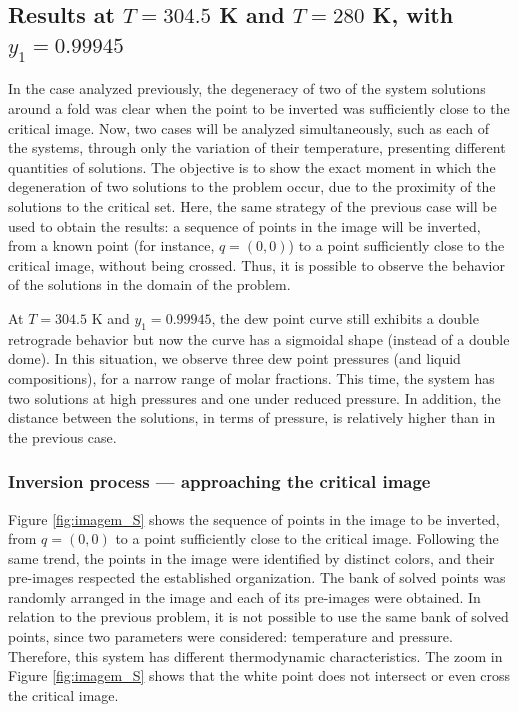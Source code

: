 \documentclass[journal=iecred,manuscript=article]{achemso}
\theoremstyle{definition}
\theoremstyle{remark}
\begin{document}
\subsection{Results at $ T = 304.5 $ K and $ T = 280 $ K, with $ y_1 = 0.99945 $}

In the case analyzed previously, the degeneracy of two of the system solutions around a fold was clear when the point to be inverted was sufficiently close to the critical image. Now, two cases will be analyzed simultaneously, such as each of the systems, through only the variation of their temperature, presenting different quantities of solutions. The objective is to show the exact moment in which the degeneration of two solutions to the problem occur, due to the proximity of the solutions to the critical set. Here, the same strategy of the previous case will be used to obtain the results: a sequence of points in the image will be inverted, from a known point (for instance, $ q = \left(0, 0\right) $) to a point sufficiently close to the critical image, without being crossed. Thus, it is possible to observe the behavior of the solutions in the domain of the problem.

At $T = 304.5$ K and $y_1 = 0.99945$, the dew point curve still exhibits a double retrograde behavior but now the curve has a sigmoidal shape (instead of a double dome). In this situation, we observe three dew point pressures (and liquid compositions), for a narrow range of molar fractions. This time, the system has two solutions at high pressures and one under reduced pressure. In addition, the distance between the solutions, in terms of pressure, is relatively higher than in the previous case.

\subsubsection{Inversion process --- approaching  the critical image}

Figure \ref{fig:imagem_S} shows the sequence of points in the image to be inverted, from $ q = \left(0, 0\right) $ to a point sufficiently close to the critical image. Following the same trend, the points in the image were identified by distinct colors, and their pre-images respected the established organization. The bank of solved points was randomly arranged in the image and each of its pre-images were obtained. In relation to the previous problem, it is not possible to use the same bank of solved points, since two parameters were considered: temperature and pressure. Therefore, this system has different thermodynamic characteristics. The zoom in Figure \ref{fig:imagem_S} shows that the white point does not intersect or even cross the critical image.
\end{document}
